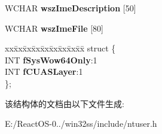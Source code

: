 \begin{DoxyCompactItemize}
\mbox{\label{structtag_i_m_e_i_n_f_o_e_x_a823d23629f7e4f41b93f6d27db08c385}} 
W\+C\+H\+AR {\bfseries wsz\+Ime\+Description} \mbox{[}50\mbox{]}
\item 
\mbox{\label{structtag_i_m_e_i_n_f_o_e_x_ab4391a41be78f29b36eae9bd1c4f8820}} 
W\+C\+H\+AR {\bfseries wsz\+Ime\+File} \mbox{[}80\mbox{]}
\item 
\mbox{\label{structtag_i_m_e_i_n_f_o_e_x_a77ef41eb415b59bb8e63ce7679d14366}} 
\begin{tabbing}
xx\=xx\=xx\=xx\=xx\=xx\=xx\=xx\=xx\=\kill
struct \{\\
\>INT {\bfseries fSysWow64Only}:1\\
\>INT {\bfseries fCUASLayer}:1\\
\}; \\

\end{tabbing}\end{DoxyCompactItemize}


该结构体的文档由以下文件生成\+:\begin{DoxyCompactItemize}
\item 
E\+:/\+React\+O\+S-\/0../win32ss/include/ntuser.\+h\end{DoxyCompactItemize}
